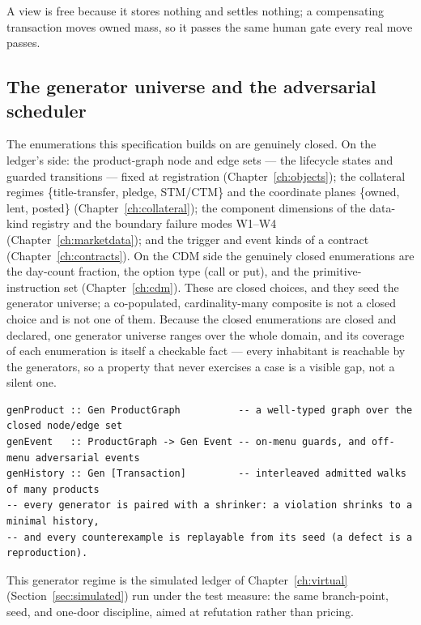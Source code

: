 \documentclass[11pt,a4paper]{article}
\begin{document}
A view is free because it stores nothing and settles nothing; a compensating transaction
moves owned mass, so it passes the same human gate every real move passes.

\subsection{The generator universe and the adversarial scheduler}

The enumerations this specification builds on are genuinely closed. On the ledger's side:
the product-graph node and edge sets --- the lifecycle states and guarded transitions ---
fixed at registration (Chapter~\ref{ch:objects}); the collateral regimes
\{title-transfer, pledge, STM/CTM\} and the coordinate planes \{owned, lent, posted\}
(Chapter~\ref{ch:collateral}); the component dimensions of the data-kind registry and the
boundary failure modes W1--W4 (Chapter~\ref{ch:marketdata}); and the trigger and event
kinds of a contract (Chapter~\ref{ch:contracts}). On the CDM side the genuinely closed
enumerations are the day-count fraction, the option type (call or put), and the
primitive-instruction set (Chapter~\ref{ch:cdm}). These are closed choices, and they seed
the generator universe; a co-populated, cardinality-many composite is not a closed choice
and is not one of them. Because the closed enumerations are closed and declared, one
generator universe ranges over the whole domain, and its coverage of each enumeration is
itself a checkable fact --- every inhabitant is reachable by the generators, so a property
that never exercises a case is a visible gap, not a silent one.

\begin{lstlisting}
genProduct :: Gen ProductGraph          -- a well-typed graph over the closed node/edge set
genEvent   :: ProductGraph -> Gen Event -- on-menu guards, and off-menu adversarial events
genHistory :: Gen [Transaction]         -- interleaved admitted walks of many products
-- every generator is paired with a shrinker: a violation shrinks to a minimal history,
-- and every counterexample is replayable from its seed (a defect is a reproduction).
\end{lstlisting}

This generator regime is the simulated ledger of Chapter~\ref{ch:virtual}
(Section~\ref{sec:simulated}) run under the test measure: the same branch-point,
seed, and one-door discipline, aimed at refutation rather than pricing.
\end{document}
